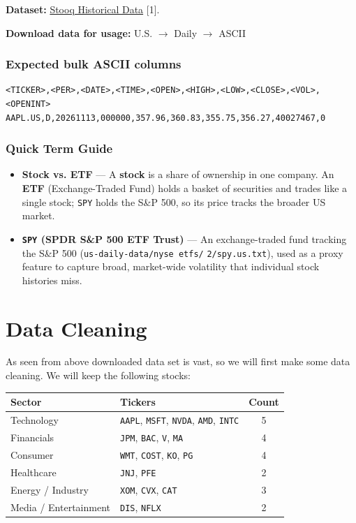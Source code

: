 \documentclass[11pt]{article}
\newcommand{\code}[1]{\texttt{#1}}
\begin{document}
\textbf{Dataset:} \href{https://stooq.com/db/h/}{Stooq Historical Data} [1].

\textbf{Download data for usage:} U.S. $\rightarrow$ Daily $\rightarrow$ ASCII

\subsubsection*{Expected bulk ASCII columns}
{\small
\begin{verbatim}
<TICKER>,<PER>,<DATE>,<TIME>,<OPEN>,<HIGH>,<LOW>,<CLOSE>,<VOL>,<OPENINT>
AAPL.US,D,20261113,000000,357.96,360.83,355.75,356.27,40027467,0
\end{verbatim}
}

\subsubsection*{Quick Term Guide}
\begin{itemize}
\item \textbf{Stock vs. ETF} --- A \textbf{stock} is a share of ownership in one company. An \textbf{ETF} (Exchange-Traded Fund) holds a basket of securities and trades like a single stock; \code{SPY} holds the S\&P 500, so its price tracks the broader US market.
\item \textbf{\code{SPY} (SPDR S\&P 500 ETF Trust)} --- An exchange-traded fund tracking the S\&P 500 (\code{us-daily-data/nyse etfs/} \code{2/spy.us.txt}), used as a proxy feature to capture broad, market-wide volatility that individual stock histories miss.
\end{itemize}

\section{Data Cleaning}

As seen from above downloaded data set is vast, so we will first make some data cleaning. We will keep the following stocks:

\begin{center}
\begin{tabular}{llc}
\hline
\textbf{Sector} & \textbf{Tickers} & \textbf{Count} \\
\hline
Technology & \code{AAPL}, \code{MSFT}, \code{NVDA}, \code{AMD}, \code{INTC} & 5 \\
Financials & \code{JPM}, \code{BAC}, \code{V}, \code{MA} & 4 \\
Consumer & \code{WMT}, \code{COST}, \code{KO}, \code{PG} & 4 \\
Healthcare & \code{JNJ}, \code{PFE} & 2 \\
Energy / Industry & \code{XOM}, \code{CVX}, \code{CAT} & 3 \\
Media / Entertainment & \code{DIS}, \code{NFLX} & 2 \\
\hline
\end{tabular}
\end{center}
\end{document}

